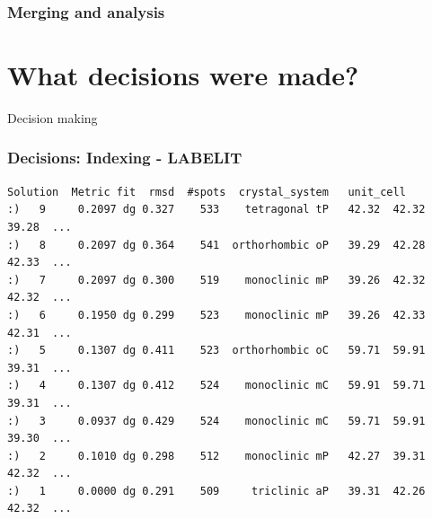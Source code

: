 \documentclass[slides,compress]{beamer}
\begin{document}
\begin{frame}
\frametitle{Merging and analysis}
\begin{itemize}
\end{itemize}
\end{frame}

\section{What decisions were made?}

\begin{frame}
\begin{center}
\Huge Decision making
\end{center}
\end{frame}

\begin{frame}[fragile]
\frametitle{Decisions: Indexing - LABELIT}
{\small
\begin{verbatim}
Solution  Metric fit  rmsd  #spots  crystal_system   unit_cell 
:)   9     0.2097 dg 0.327    533    tetragonal tP   42.32  42.32  39.28  ...
:)   8     0.2097 dg 0.364    541  orthorhombic oP   39.29  42.28  42.33  ...
:)   7     0.2097 dg 0.300    519    monoclinic mP   39.26  42.32  42.32  ...
:)   6     0.1950 dg 0.299    523    monoclinic mP   39.26  42.33  42.31  ...
:)   5     0.1307 dg 0.411    523  orthorhombic oC   59.71  59.91  39.31  ...
:)   4     0.1307 dg 0.412    524    monoclinic mC   59.91  59.71  39.31  ...
:)   3     0.0937 dg 0.429    524    monoclinic mC   59.71  59.91  39.30  ...
:)   2     0.1010 dg 0.298    512    monoclinic mP   42.27  39.31  42.32  ...
:)   1     0.0000 dg 0.291    509     triclinic aP   39.31  42.26  42.32  ...
\end{verbatim}
}
\end{frame}
\end{document}
